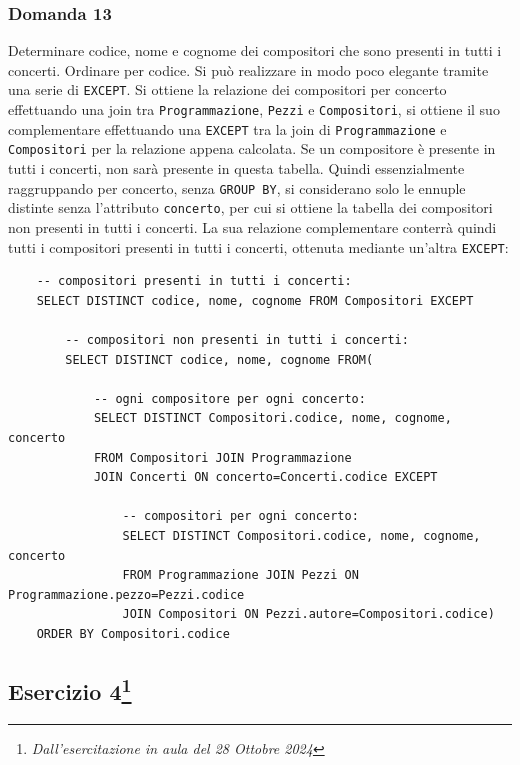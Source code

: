 \documentclass{article}
\begin{document}
\subsubsection*{Domanda 13}
Determinare codice, nome e cognome dei compositori che sono presenti in tutti i concerti. Ordinare per codice. Si può realizzare in modo poco elegante tramite una serie di \verb|EXCEPT|. Si ottiene la 
relazione dei compositori per concerto effettuando una join tra \verb|Programmazione|, \verb|Pezzi| e \verb|Compositori|, si ottiene il suo complementare effettuando una \verb|EXCEPT| tra la join di \verb|Programmazione| e 
\verb|Compositori| per la relazione appena calcolata. Se un compositore è presente in tutti i concerti, non sarà presente in questa tabella. Quindi essenzialmente raggruppando per concerto, senza \verb|GROUP BY|, si 
considerano solo le ennuple distinte senza l'attributo \verb|concerto|, per cui si ottiene la tabella dei compositori non presenti in tutti i concerti. La sua relazione complementare conterrà quindi tutti i compositori 
presenti in tutti i concerti, ottenuta mediante un'altra \verb|EXCEPT|:
\begin{verbatim}
    -- compositori presenti in tutti i concerti:
    SELECT DISTINCT codice, nome, cognome FROM Compositori EXCEPT
        
        -- compositori non presenti in tutti i concerti:
        SELECT DISTINCT codice, nome, cognome FROM(

            -- ogni compositore per ogni concerto:
            SELECT DISTINCT Compositori.codice, nome, cognome, concerto
            FROM Compositori JOIN Programmazione 
            JOIN Concerti ON concerto=Concerti.codice EXCEPT

                -- compositori per ogni concerto:
                SELECT DISTINCT Compositori.codice, nome, cognome, concerto
                FROM Programmazione JOIN Pezzi ON Programmazione.pezzo=Pezzi.codice
                JOIN Compositori ON Pezzi.autore=Compositori.codice)
    ORDER BY Compositori.codice
\end{verbatim}

\subsection{Esercizio 4\footnote{\textit{Dall'esercitazione in aula del 28 Ottobre 2024}}}
\end{document}
